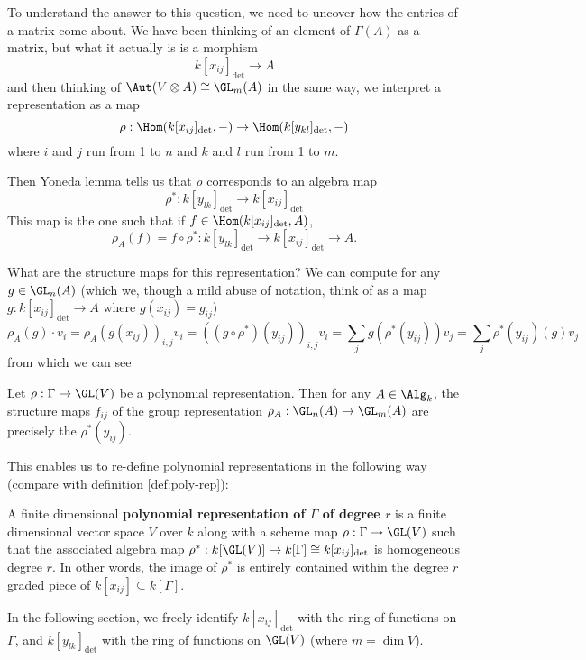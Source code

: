 \documentclass[12pt]{article}
\begin{document}
To understand the answer to this question, we need to uncover how the entries of a matrix come about. We have been thinking of an element of 
$\Gamma(A)$ as a matrix, but what it actually is is a morphism 
\[k[x_{ij}]_{\det}\to A\]
and then thinking of $\Aut(V\otimes A)\cong\GL_m(A)$ in the same way, we interpret a representation 
as a map 
\[\rho:\Hom(k[x_{ij}]_{\det},-)\to \Hom(k[y_{kl}]_{\det},-)\]
where $i$ and $j$ run from 1 to $n$ and $k$ and $l$ run from 1 to $m$. 

Then Yoneda lemma tells us that $\rho$ corresponds to an algebra map
\[\rho^\ast:k[y_{lk}]_{\det}\to k[x_{ij}]_{\det}\]
This map is the one such that if $f\in\Hom(k[x_{ij}]_{\det},A)$,
\[\rho_A(f)=f\circ\rho^\ast:k[y_{lk}]_{\det}\to k[x_{ij}]_{\det}\to A.\]

What are the structure maps for this representation? We can compute for any $g\in \GL_n(A)$ (which we, though a mild
abuse of notation, think of as a map $g:k[x_{ij}]_{\det}\to A$ where $g(x_{ij})=g_{ij}$)
\[\rho_A(g)\cdot v_i=\rho_A(g(x_{ij}))_{i,j}v_i=((g\circ\rho^\ast)(y_{ij}))_{i,j}v_i=\sum_j g(\rho^\ast(y_{ij}))v_j=\sum_j\rho^\ast(y_{ij})(g)v_j\]
from which we can see
\begin{lem}
	Let $\rho:\Gamma\to \GL(V)$ be a polynomial representation. Then for any $A\in\Alg_k$, the structure maps $f_{ij}$ 
	of the group representation $\rho_A:\GL_n(A)\to \GL_m(A)$ are precisely the $\rho^\ast(y_{ij})$.
\end{lem}

This enables us to re-define polynomial representations 
in the following way (compare with definition \ref{def:poly-rep}):
\begin{defn}\label{def:poly-rep-new}
	A finite dimensional \textbf{polynomial representation of $\Gamma$ of degree $r$} is a finite dimensional vector space $V$ 
	over $k$ along with a scheme map $\rho:\Gamma\to \GL(V)$ such that the associated algebra map $\rho^\ast:k[\GL(V)]\to k[\Gamma]\cong k[x_{ij}]_{\det}$ is homogeneous 
	degree $r$. In other words, the image of $\rho^\ast$ is entirely contained within the degree $r$ graded piece of $k[x_{ij}]\subseteq k[\Gamma]$.
\end{defn}

\begin{rmk}
	In the following section, we freely identify $k[x_{ij}]_{\det}$ with the ring of functions on $\Gamma$, and $k[y_{lk}]_{\det}$ with 
	the ring of functions on $\GL(V)$ (where $m=\dim V$).
\end{rmk}
\end{document}
